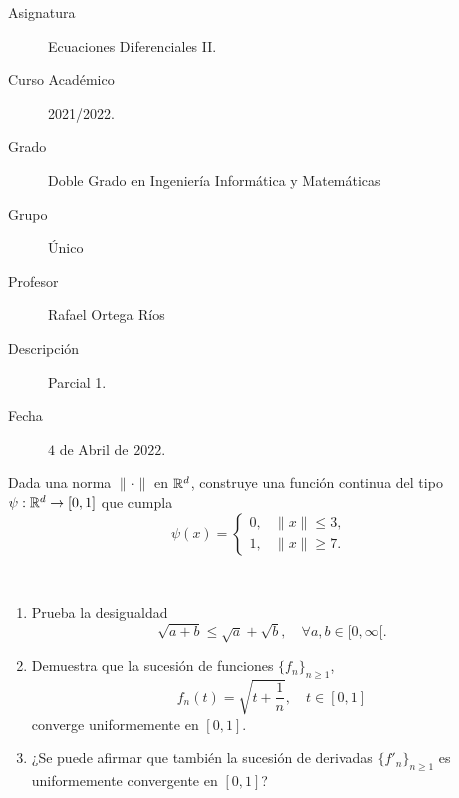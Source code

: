 \documentclass[12pt]{article}
\begin{document}

    
    

    \begin{description}
        \item[Asignatura] Ecuaciones Diferenciales II.
        \item[Curso Académico] 2021/2022.
        \item[Grado] Doble Grado en Ingeniería Informática y Matemáticas
        \item[Grupo] Único
        \item[Profesor] Rafael Ortega Ríos
        \item[Descripción] Parcial 1.
        \item[Fecha] $4$ de Abril de $2022$.
    
    \end{description}
    \newpage


    
    \begin{ejercicio}
        Dada una norma $\|\cdot\|$ en $\mathbb{R}^d$, construye una función continua del tipo $\psi : \mathbb{R}^d \to [0, 1]$ que cumpla
        \begin{equation*}
            \psi(x) = \begin{cases}
                0, & \|x\| \leq 3,\\
                1, & \|x\| \geq 7.
            \end{cases}
        \end{equation*}
    \end{ejercicio}

    \begin{ejercicio}~
        \begin{enumerate}[label=\alph*)]
            \item Prueba la desigualdad
            \[
            \sqrt{a+b} \leq \sqrt{a} + \sqrt{b}, \quad \forall a, b \in [0, \infty[.
            \]
            \item Demuestra que la sucesión de funciones $\{f_n\}_{n \geq 1}$,
            \[
            f_n(t) = \sqrt{t + \frac{1}{n}}, \quad t \in [0, 1]
            \]
            converge uniformemente en $[0, 1]$.
            \item ¿Se puede afirmar que también la sucesión de derivadas $\{f'_n\}_{n \geq 1}$ es uniformemente convergente en $[0, 1]$?
        \end{enumerate}
    \end{ejercicio}
\end{document}
